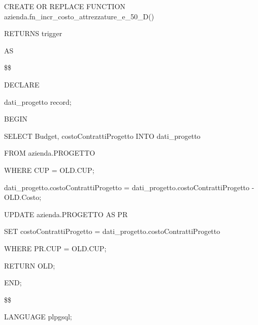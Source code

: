         \begin{flushleft}
            \begin{description}
                \item CREATE OR REPLACE FUNCTION azienda.fn\_incr\_costo\_attrezzature\_e\_50\_D()  
                \item RETURNS trigger
                \item AS
                \item \$\$
                \item DECLARE
                \begin{description}
                    \item dati\_progetto record;
                \end{description}
                \item BEGIN 
                \begin{description}
                    \item SELECT Budget, costoContrattiProgetto INTO dati\_progetto
                    \item FROM azienda.PROGETTO
                    \item WHERE CUP = OLD.CUP;
                
                    \vspace{0.5cm}

                    \item dati\_progetto.costoContrattiProgetto = dati\_progetto.costoContrattiProgetto - OLD.Costo;
                
                    \vspace{0.5cm}

                    \item UPDATE azienda.PROGETTO AS PR
                    \item SET costoContrattiProgetto = dati\_progetto.costoContrattiProgetto
                    \item WHERE PR.CUP = OLD.CUP;
                
                    \item RETURN OLD;

                \end{description}

                \item END;
                \item \$\$
                \item LANGUAGE plpgsql;
            \end{description}
        \end{flushleft}
    \normalfont


